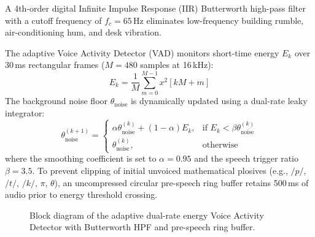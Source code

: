 \documentclass[11pt,a4paper,oneside]{report}
\begin{document}
A 4th-order digital Infinite Impulse Response (IIR) Butterworth high-pass filter with a cutoff frequency of $f_c = 65$\,Hz eliminates low-frequency building rumble, air-conditioning hum, and desk vibration. 

The adaptive Voice Activity Detector (VAD) monitors short-time energy $E_k$ over 30\,ms rectangular frames ($M = 480$ samples at 16\,kHz):
\begin{equation}
  E_k = \frac{1}{M} \sum_{m=0}^{M-1} x^2[kM + m]
\end{equation}
The background noise floor $\theta_{\text{noise}}$ is dynamically updated using a dual-rate leaky integrator:
\begin{equation}
  \theta_{\text{noise}}^{(k+1)} = 
  \begin{cases}
    \alpha \theta_{\text{noise}}^{(k)} + (1 - \alpha) E_k, & \text{if } E_k < \beta \theta_{\text{noise}}^{(k)} \\
    \theta_{\text{noise}}^{(k)}, & \text{otherwise}
  \end{cases}
\end{equation}
where the smoothing coefficient is set to $\alpha = 0.95$ and the speech trigger ratio $\beta = 3.5$. To prevent clipping of initial unvoiced mathematical plosives (e.g., $/p/$, $/t/$, $/k/$, $\pi$, $\theta$), an uncompressed circular pre-speech ring buffer retains 500\,ms of audio prior to energy threshold crossing.

\begin{figure}[htbp]
\centering
{}
\caption{Block diagram of the adaptive dual-rate energy Voice Activity Detector with Butterworth HPF and pre-speech ring buffer.}
\label{fig:vad_flow}
\end{figure}
\end{document}
